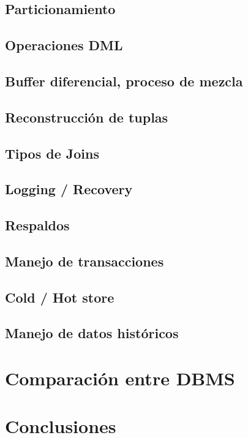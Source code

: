 \documentclass{acmart}
\begin{document}
\subsection{Particionamiento}
\subsection{Operaciones DML}
\subsection{Buffer diferencial, proceso de mezcla}
\subsection{Reconstrucción de tuplas}
\subsection{Tipos de Joins}
\subsection{Logging / Recovery}
\subsection{Respaldos}
\subsection{Manejo de transacciones}
\subsection{Cold / Hot store}
\subsection{Manejo de datos históricos}

\newpage

\section{Comparación entre DBMS}

\section{Conclusiones}

\begin{thebibliography}{99}
\bibitem{}

\end{thebibliography}
\end{document}

